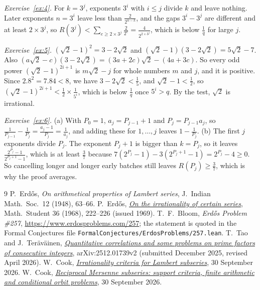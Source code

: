 \documentclass[10pt]{article}
\theoremstyle{plain}
\theoremstyle{definition}
\theoremstyle{remark}
\begin{document}
\emph{Exercise~\ref{ex:4}.} For $k=3^j$, exponents $3^i$ with $i\le j$ divide
$k$ and leave nothing. Later exponents $n=3^i$ leave less than
$\tfrac2{2^{n-k}}$, and the gaps $3^i-3^j$ are different and at least
$2\times3^j$, so $R(3^j)<\sum_{e\ge2\times3^j}\tfrac2{2^e}=\tfrac4{2^{2\times3^j}}$,
which is below $\tfrac1q$ for large $j$.

\emph{Exercise~\ref{ex:5}.} $(\sqrt2-1)^2=3-2\sqrt2$ and
$(\sqrt2-1)(3-2\sqrt2)=5\sqrt2-7$. Also
$(a\sqrt2-c)(3-2\sqrt2)=(3a+2c)\sqrt2-(4a+3c)$. So every odd power
$(\sqrt2-1)^{2i+1}$ is $m\sqrt2-j$ for whole numbers $m$ and $j$, and it is
positive. Since $2.8^2=7.84<8$, we have $3-2\sqrt2<\tfrac15$, and
$\sqrt2-1<\tfrac12$, so $(\sqrt2-1)^{2i+1}<\tfrac12\times\tfrac1{5^i}$, which is
below $\tfrac1q$ once $5^i>q$. By the test, $\sqrt2$ is irrational.

\emph{Exercise~\ref{ex:6}.} (a) With $P_0=1$, $a_j=P_{j-1}+1$ and
$P_j=P_{j-1}a_j$, so
$\tfrac1{P_{j-1}}-\tfrac1{P_j}=\tfrac{a_j-1}{P_j}=\tfrac1{a_j}$, and adding
these for $1,\dots,j$ leaves $1-\tfrac1{P_j}$. (b) The first $j$ exponents
divide $P_j$. The exponent $P_j+1$ is bigger than $k=P_j$, so it leaves
$\tfrac{2^{P_j}-1}{2^{P_j+1}-1}$, which is at least $\tfrac37$ because
$7(2^{P_j}-1)-3(2^{P_j+1}-1)=2^{P_j}-4\ge0$. So cancelling longer and longer
early batches still leaves $R(P_j)\ge\tfrac37$, which is why the proof
averages.

\endgroup

\begin{thebibliography}{9}
 P.~Erd\H{o}s, \emph{On arithmetical properties of Lambert
 series}, J.~Indian Math.\ Soc.\ 12 (1948), 63--66.
 P.~Erd\H{o}s,
 \href{https://users.renyi.hu/~p_erdos/1969-09.pdf}{\emph{On the irrationality of
 certain series}}, Math.\ Student 36 (1968), 222--226 (issued 1969).
 T.~F.~Bloom, \emph{Erd\H{o}s Problem \#257},
 \url{https://www.erdosproblems.com/257}; the statement is quoted in the Formal
 Conjectures file \texttt{FormalConjectures/ErdosProblems/257.lean}.
 T.~Tao and J.~Ter\"av\"ainen,
 \href{https://arxiv.org/abs/2512.01739v2}{\emph{Quantitative correlations and
 some problems on prime factors of consecutive integers}}, arXiv:2512.01739v2
 (submitted December 2025, revised April 2026).
 W.~Cook,
 \href{https://github.com/wcook04/plectis-erdos/blob/0064fc9b2a2693de97aebc8abec26090c3cd1095/paper/257/erdos-257-mersenne-support-subseries.pdf}{\emph{Irrationality
 criteria for Lambert subseries}}, 30 September 2026.
 W.~Cook,
 \href{https://github.com/wcook04/plectis-erdos/blob/0064fc9b2a2693de97aebc8abec26090c3cd1095/paper/257/erdos257-mersenne-reasoning-surface.pdf}{\emph{Reciprocal
 Mersenne subseries: support criteria, finite arithmetic and conditional orbit
 problems}}, 30 September 2026.
\end{thebibliography}
\end{document}
